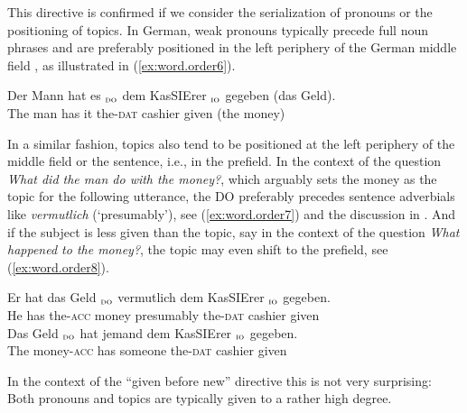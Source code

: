 \documentclass[output=paper,colorlinks,citecolor=brown]{langscibook}
\begin{document}
This directive is confirmed if we consider the serialization of pronouns or the positioning of topics. In German, weak pronouns typically precede full noun phrases and are preferably positioned in the left periphery of the German middle field \citep{wackernagel1892}, as illustrated in (\ref{ex:word.order6}).

\ea \label{ex:word.order6}
    \gll Der Mann hat {\ob} es {\cb}$_{\textsc{do}}$ {\ob} dem KasSIErer {\cb}$_{\textsc{io}}$  gegeben (das Geld).\\
    The man has {} it {} {} the-\textsc{dat} cashier  {}  given (the money)\\
\z  

In a similar fashion, topics also tend to be positioned at the left periphery of the middle field or the sentence, i.e., in the prefield. In the context of the question \textit{What did the man do with the money?}, which arguably sets the money as the topic for the following utterance, the DO preferably precedes sentence adverbials like \textit{vermutlich} (`presumably'), see (\ref{ex:word.order7}) and the discussion in \citet{frey2000}. And if the subject is less given than the topic, say in the context of the question \textit{What happened to the money?}, the topic may even shift to the prefield, see (\ref{ex:word.order8}).  

\ea \label{ex:word.order7}
    \gll Er hat {\ob} das Geld {\cb}$_{\textsc{do}}$ vermutlich {\ob} dem KasSIErer {\cb}$_{\textsc{io}}$  gegeben.\\
    He has {} the-\textsc{acc} money  {} presumably {} the-\textsc{dat} cashier  {}  given\\
\ex \label{ex:word.order8}
    \gll {\ob} Das Geld {\cb}$_{\textsc{do}}$ hat {\ob} jemand {\cb} {\ob} dem KasSIErer {\cb}$_{\textsc{io}}$  gegeben.\\
    {} The money-\textsc{acc}  {} has {} someone {} {} the-\textsc{dat} cashier  {}  given\\
\z
      
      
In the context of the ``given before new'' directive this is not very surprising: Both pronouns and topics are typically given to a rather high degree.
\end{document}
